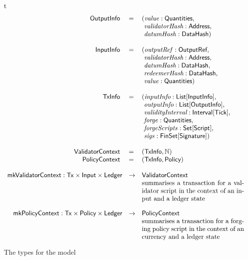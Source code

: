 %
\begin{ruledfigure}{t}
  \begin{displaymath}
  \begin{array}{rll}
    \s{OutputInfo}\s{ } &=&(\val: \Quantities,\\
                          & &\ \i{validatorHash}: \Address,\\
                          & &\ \datumHash: \DataHash)\\
    \\
    \s{InputInfo}\s{ } &=& (\outputref: \s{OutputRef},\\
                         & &\ \i{validatorHash}: \Address,\\
                         & &\ \i{datumHash}: \DataHash,\\
                         & &\ \i{redeemerHash}: \DataHash,\\
                         & &\ \val: \Quantities)\\
     \\
     \s{TxInfo}\s{ } &=&(\i{inputInfo}: \List{\s{InputInfo}},\\
                 & &\ \i{outputInfo}: \List{\s{OutputInfo}},\\
                 & &\ \i{validityInterval}: \Interval{\Tick},\\
                 & &\ \forge: \Quantities,\\
                 & &\ \forgeScripts: \Set{\Script},\\
                 & &\ \sigs: \FinSet{\Signature})\\
    \\
    \s{\vlctx}\s{ } &=& (\s{TxInfo}, \N) \\
    \s{\mpsctx}\s{ } &=& (\s{TxInfo}, \Policy) \\
    \\
    \mkVlContext: \eutxotx \times \s{Input} \times \Ledger & \rightarrow &\vlctx\\
                     & &   \mbox{\parbox[t]{55mm}{summarises a transaction for a validator script in the context of an input and a ledger state}}\\
 \\
    \mkMpsContext: \eutxotx \times \Policy \times \Ledger & \rightarrow & \mpsctx\\
                     & &   \mbox{\parbox[t]{55mm}{summarises a transaction for a forging policy script in the context of an currency and a ledger state}}\\
  \end{array}
  \end{displaymath}
  \caption{The \ctx{} types for the \EUTXOma{} model}
  \label{fig:ctx-types}
\end{ruledfigure}

